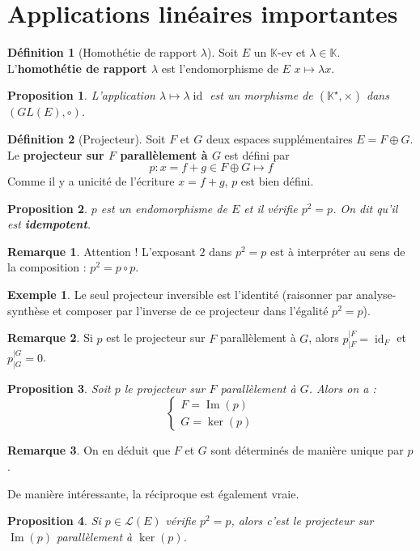 \documentclass[french]{book}
\newcommand{\K}{\mathbb{K}}
\newcommand{\st}{^\star}
\theoremstyle{plain}
\newtheorem{prop}{Proposition}[chapter]
\theoremstyle{definition}
\newtheorem{dfn}{Définition}[chapter]
\newtheorem{exa}{Exemple}[chapter]
\newtheorem{rmq}{Remarque}[chapter]
\theoremstyle{remark}
\DeclareMathOperator{\id}{id}
\DeclareMathOperator{\im}{Im}
\begin{document}
\section{Applications linéaires importantes} %
\begin{dfn}[Homothétie de rapport $\lambda$]
	Soit $E$ un $\K$-ev et $\lambda\in\K$. L'\textbf{homothétie de rapport $\lambda$} est l'endomorphisme de $E$ $x\mapsto\lambda x$.
\end{dfn}
\begin{prop}
	L'application $\lambda\mapsto\lambda\id$ est un morphisme de $(\K\st,\times)$ dans $(GL(E),\circ)$.
\end{prop}
\begin{dfn}[Projecteur]
	Soit $F$ et $G$ deux espaces supplémentaires $ E=F\oplus G$. Le \textbf{projecteur sur $F$ parallèlement à $G$} est défini par $$p:x=f+g\in F\oplus G\mapsto f$$ Comme il y a unicité de l'écriture $x=f+g$, $p$ est bien défini.
\end{dfn}
\begin{prop}
	$p$ est un endomorphisme de $E$ et il vérifie $p^2=p$. On dit qu'il est \textbf{idempotent}.
\end{prop}
\begin{rmq}
	Attention ! L'exposant $2$ dans $p^2=p$ est à interpréter au sens de la composition : $p^2=p\circ p$.
\end{rmq}
\begin{exa}
	Le seul projecteur inversible est l'identité (raisonner par analyse-synthèse et composer par l'inverse de ce projecteur dans l'égalité $p^2=p$).
\end{exa}
\begin{rmq}
	Si $p$ est le projecteur sur $F$ parallèlement à $G$, alors $\displaystyle p_{|F}^{|F}=\id_F$ et $\displaystyle p_{|G}^{|G}=0$.
\end{rmq}
\begin{prop}
	Soit $p$ le projecteur sur $F$ parallèlement à $G$. Alors on a : $$\left \{\begin{array}{ll}F=\im(p)\\ G=\ker(p)\end{array}\right.$$
\end{prop}
\begin{rmq}
	On en déduit que $F$ et $G$ sont déterminés de manière unique par $p$.
\end{rmq}
De manière intéressante, la réciproque est également vraie.
\begin{prop}
	Si $p\in\mathcal{L}(E)$ vérifie $p^2=p$, alors c'est le projecteur sur $\im(p)$ parallèlement à $\ker(p)$.
\end{prop}
\end{document}
